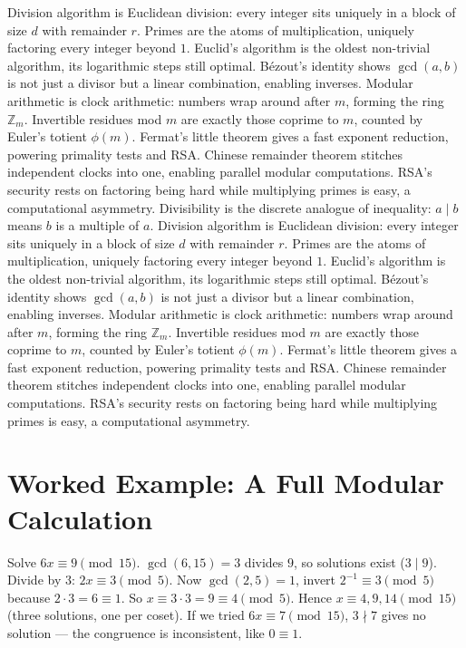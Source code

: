 Division algorithm is Euclidean division: every integer sits uniquely in a block of size $d$ with remainder $r$.
Primes are the atoms of multiplication, uniquely factoring every integer beyond $1$.
Euclid's algorithm is the oldest non-trivial algorithm, its logarithmic steps still optimal.
B\'ezout's identity shows $\gcd(a,b)$ is not just a divisor but a linear combination, enabling inverses.
Modular arithmetic is clock arithmetic: numbers wrap around after $m$, forming the ring $\mathbb{Z}_m$.
Invertible residues mod $m$ are exactly those coprime to $m$, counted by Euler's totient $\phi(m)$.
Fermat's little theorem gives a fast exponent reduction, powering primality tests and RSA.
Chinese remainder theorem stitches independent clocks into one, enabling parallel modular computations.
RSA's security rests on factoring being hard while multiplying primes is easy, a computational asymmetry.
Divisibility is the discrete analogue of inequality: $a\mid b$ means $b$ is a multiple of $a$.
Division algorithm is Euclidean division: every integer sits uniquely in a block of size $d$ with remainder $r$.
Primes are the atoms of multiplication, uniquely factoring every integer beyond $1$.
Euclid's algorithm is the oldest non-trivial algorithm, its logarithmic steps still optimal.
B\'ezout's identity shows $\gcd(a,b)$ is not just a divisor but a linear combination, enabling inverses.
Modular arithmetic is clock arithmetic: numbers wrap around after $m$, forming the ring $\mathbb{Z}_m$.
Invertible residues mod $m$ are exactly those coprime to $m$, counted by Euler's totient $\phi(m)$.
Fermat's little theorem gives a fast exponent reduction, powering primality tests and RSA.
Chinese remainder theorem stitches independent clocks into one, enabling parallel modular computations.
RSA's security rests on factoring being hard while multiplying primes is easy, a computational asymmetry.

\section{Worked Example: A Full Modular Calculation}
Solve $6x\equiv9\pmod{15}$. $\gcd(6,15)=3$ divides $9$, so solutions exist ($3\mid9$). Divide by $3$: $2x\equiv3\pmod5$. Now $\gcd(2,5)=1$, invert $2^{-1}\equiv3\pmod5$ because $2\cdot3=6\equiv1$. So $x\equiv3\cdot3=9\equiv4\pmod5$. Hence $x\equiv4,9,14\pmod{15}$ (three solutions, one per coset). If we tried $6x\equiv7\pmod{15}$, $3\nmid7$ gives no solution --- the congruence is inconsistent, like $0\equiv1$.

